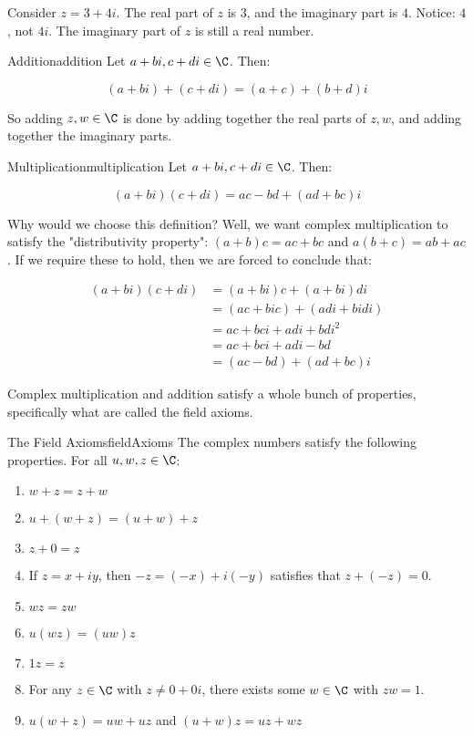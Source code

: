 \begin{ex}{}{} Consider $z = 3 + 4i$. The real part of $z$ is $3$, and the imaginary part is $4$. Notice: $4$, not $4i$. The imaginary part of $z$ is still a real number.
\end{ex}


\begin{defbo}{Addition}{addition}
 Let $a+bi, c+di \in \C$. Then:

$$(a+bi) + (c+di) = (a+c) + (b+d)i$$
\end{defbo}

So adding $z,w \in \C$ is done by adding together the real parts of $z,w$, and adding together the imaginary parts.

\begin{defbo}{Multiplication}{multiplication} 
Let $a + bi, c+di \in \C$. Then:

$$(a+bi)(c+di) = ac - bd + (ad + bc)i$$
\end{defbo}

Why would we choose this definition? Well, we want complex multiplication to satisfy the "distributivity property": $(a+b)c = ac+bc$ and $a(b+c) = ab + ac$. If we require these to hold, then we are forced to conclude that:

\begin{align*}(a+bi)(c+di) &= (a+bi)c + (a+bi)di\\
&= (ac + bic) + (adi + bidi)\\
&= ac + bci + adi + bdi^2\\
&= ac + bci + adi - bd\\
&= (ac -bd) + (ad + bc)i
\end{align*}

Complex multiplication and addition satisfy a whole bunch of properties, specifically what are called the field axioms.


\begin{thmbo}{The Field Axioms}{fieldAxioms}
The complex numbers satisfy the following properties. For all $u, w, z \in \C$:

\begin{enumerate}
\item $w + z = z + w$
\item $u + (w + z) = (u+ w) + z$
\item $z + 0 = z$
\item If $z = x + iy$, then $-z = (-x) + i(-y)$ satisfies that $z + (-z) = 0$.
\item $wz = zw$
\item $u(wz) = (uw)z$
\item $1z = z$
\item For any $z\in \C$ with $z\ne 0 + 0i$, there exists some $w\in \C$ with $zw = 1$. 
\item $u(w+z) = uw + uz$ and $(u+w)z= uz + wz$
\end{enumerate}
\end{thmbo}

